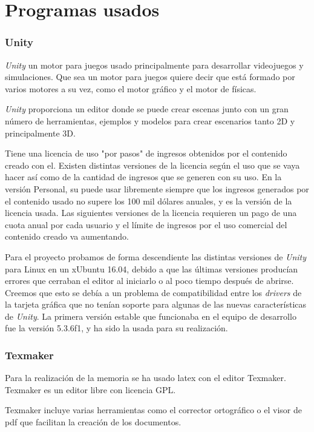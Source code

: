 
\section{Programas usados}

\subsubsection{Unity}
\textit{Unity} un motor para juegos usado principalmente para desarrollar videojuegos y simulaciones. Que sea un motor para juegos quiere decir que está formado por varios motores a su vez, como el motor gráfico y el motor de físicas.

\textit{Unity} proporciona un editor donde se puede crear escenas junto con un gran número de herramientas, ejemplos y modelos para crear escenarios tanto 2D y principalmente 3D.

Tiene una licencia de uso "por pasos" de ingresos obtenidos por el contenido creado con el. Existen distintas versiones de la licencia según el uso que se vaya hacer así como de la cantidad de ingresos que se generen con su uso. En la versión Personal, su puede usar libremente siempre que los ingresos generados por el contenido usado no supere los 100 mil dólares anuales, y es la versión de la licencia usada. Las siguientes versiones de la licencia requieren un pago de una cuota anual por cada usuario y el límite de ingresos por el uso comercial del contenido creado va aumentando.

Para el proyecto probamos de forma descendiente las distintas versiones de \textit{Unity} para Linux en un xUbuntu 16.04, debido a que las últimas versiones producían errores que cerraban el editor al iniciarlo o al poco tiempo después de abrirse. Creemos que esto se debía a un problema de compatibilidad entre los \textit{drivers} de la tarjeta gráfica que no tenían soporte para algunas de las nuevas características de \textit{Unity}. La primera versión estable que funcionaba en el equipo de desarrollo fue la versión 5.3.6f1, y ha sido la usada para su realización.

\subsubsection{Texmaker}
Para la realización de la memoria se ha usado latex con el editor Texmaker.
Texmaker es un editor libre con licencia GPL.

Texmaker incluye varias herramientas como el corrector ortográfico o el visor de pdf que facilitan la creación de los documentos.

